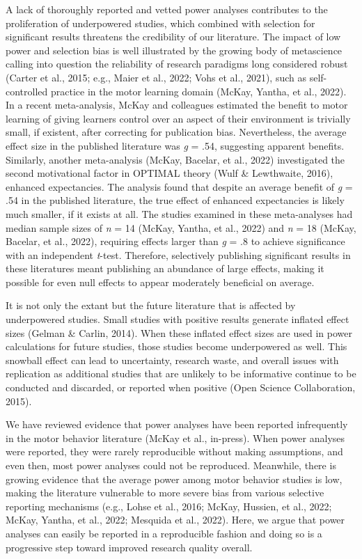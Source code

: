 \documentclass[
  man, donotrepeattitle,mask,floatsintext]{apa7}
\begin{document}
A lack of thoroughly reported and vetted power analyses contributes to the proliferation of underpowered studies, which combined with selection for significant results threatens the credibility of our literature. The impact of low power and selection bias is well illustrated by the growing body of metascience calling into question the reliability of research paradigms long considered robust (Carter et al., 2015; e.g., Maier et al., 2022; Vohs et al., 2021), such as self-controlled practice in the motor learning domain (McKay, Yantha, et al., 2022). In a recent meta-analysis, McKay and colleagues estimated the benefit to motor learning of giving learners control over an aspect of their environment is trivially small, if existent, after correcting for publication bias. Nevertheless, the average effect size in the published literature was \emph{g} = .54, suggesting apparent benefits. Similarly, another meta-analysis (McKay, Bacelar, et al., 2022) investigated the second motivational factor in OPTIMAL theory (Wulf \& Lewthwaite, 2016), enhanced expectancies. The analysis found that despite an average benefit of \emph{g} = .54 in the published literature, the true effect of enhanced expectancies is likely much smaller, if it exists at all. The studies examined in these meta-analyses had median sample sizes of \emph{n} = 14 (McKay, Yantha, et al., 2022) and \emph{n} = 18 (McKay, Bacelar, et al., 2022), requiring effects larger than \emph{g} = .8 to achieve significance with an independent \emph{t}-test. Therefore, selectively publishing significant results in these literatures meant publishing an abundance of large effects, making it possible for even null effects to appear moderately beneficial on average.

It is not only the extant but the future literature that is affected by underpowered studies. Small studies with positive results generate inflated effect sizes (Gelman \& Carlin, 2014). When these inflated effect sizes are used in power calculations for future studies, those studies become underpowered as well. This snowball effect can lead to uncertainty, research waste, and overall issues with replication as additional studies that are unlikely to be informative continue to be conducted and discarded, or reported when positive (Open Science Collaboration, 2015).

We have reviewed evidence that power analyses have been reported infrequently in the motor behavior literature (McKay et al., in-press). When power analyses were reported, they were rarely reproducible without making assumptions, and even then, most power analyses could not be reproduced. Meanwhile, there is growing evidence that the average power among motor behavior studies is low, making the literature vulnerable to more severe bias from various selective reporting mechanisms (e.g., Lohse et al., 2016; McKay, Hussien, et al., 2022; McKay, Yantha, et al., 2022; Mesquida et al., 2022). Here, we argue that power analyses can easily be reported in a reproducible fashion and doing so is a progressive step toward improved research quality overall.
\end{document}
